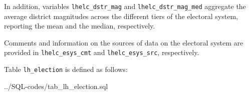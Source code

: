 In addition, 
variables \texttt{\footnotesize lhelc\_dstr\_mag} and \texttt{\footnotesize lhelc\_dstr\_mag\_med} aggregate the average district magnitudes across the different tiers of the electoral system, reporting the mean and the median, respectively.

Comments and information on the sources of data on the electoral system are provided in \texttt{\footnotesize lhelc\_esys\_cmt} and \texttt{\footnotesize lhelc\_esys\_src}, respectively.

Table \texttt{\footnotesize lh\_election}  is defined as follows:

%
{../SQL-codes/tab_lh_election.sql}
